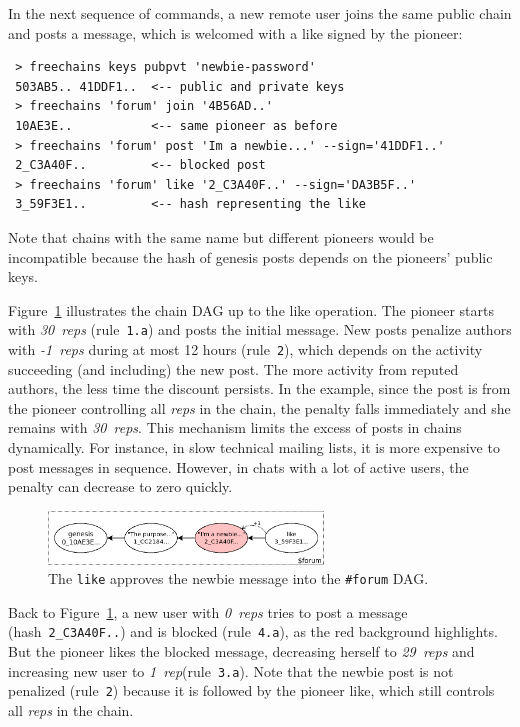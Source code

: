 \documentclass[12pt]{article}
\newcommand{\reps}     {\emph{reps}\xspace}
\newcommand{\onerep}   {\emph{1~rep}\xspace}
\newcommand{\nreps}[1] {\emph{#1~reps\xspace}}
\newcommand{\code}[1]  {\texttt{\footnotesize{#1}}}
\begin{document}
In the next sequence of commands, a new remote user joins the same public chain
and posts a message, which is welcomed with a like signed by the pioneer:

{\footnotesize
\begin{verbatim}
 > freechains keys pubpvt 'newbie-password'
 503AB5.. 41DDF1..  <-- public and private keys
 > freechains 'forum' join '4B56AD..'
 10AE3E..           <-- same pioneer as before
 > freechains 'forum' post 'Im a newbie...' --sign='41DDF1..'
 2_C3A40F..         <-- blocked post
 > freechains 'forum' like '2_C3A40F..' --sign='DA3B5F..'
 3_59F3E1..         <-- hash representing the like
\end{verbatim}
}

Note that chains with the same name but different pioneers would be
incompatible because the hash of genesis posts depends on the pioneers' public
keys.

Figure~\ref{fig.forum} illustrates the chain DAG up to the like operation.
The pioneer starts with \nreps{30} (rule~\code{1.a}) and posts the initial
message.
%
New posts penalize authors with \nreps{-1} during at most 12 hours
(rule~\code{2}), which depends on the activity succeeding (and including) the
new post.
The more activity from reputed authors, the less time the discount persists.
In the example, since the post is from the pioneer controlling all \reps in the
chain, the penalty falls immediately and she remains with \nreps{30}.
This mechanism limits the excess of posts in chains dynamically.
For instance, in slow technical mailing lists, it is more expensive to post
messages in sequence.
However, in chats with a lot of active users, the penalty can decrease to zero
quickly.

\begin{figure}
\centering
\includegraphics[width=0.65\textwidth]{forum.png}
\caption{
    The \code{like} approves the newbie message into the \code{\#forum} DAG.
}
\label{fig.forum}
\end{figure}

Back to Figure~\ref{fig.forum}, a new user with \nreps{0} tries to post a
message (hash~\code{2\_C3A40F..}) and is blocked (rule~\code{4.a}), as the red
background highlights.
But the pioneer likes the blocked message, decreasing herself to \nreps{29}
and increasing new user to \onerep (rule~\code{3.a}).
Note that the newbie post is not penalized (rule~\code{2}) because it is
followed by the pioneer like, which still controls all \reps in the chain.
\end{document}
